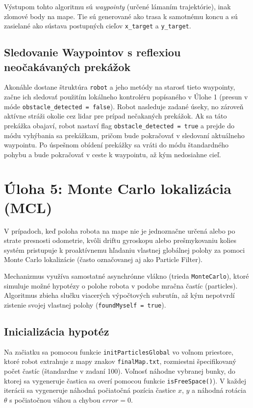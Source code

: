 Výstupom tohto algoritmu sú \textit{waypointy} (určené lámaním trajektórie), inak zlomové body na mape. Tie sú generované ako trasa k samotnému koncu a sú zasielané ako sústava postupných cieľov \texttt{x\_target} a \texttt{y\_target}. 

\subsection{Sledovanie Waypointov s reflexiou neočakávaných prekážok}
Akonáhle dostane štruktúra \texttt{robot} a jeho metódy na starosť tieto waypointy, začne ich sledovať použitím lokálneho kontroléru popísaného v Úlohe 1 (presun v móde \texttt{obstacle\_detected = false}). Robot nasleduje zadané úseky, no zároveň aktívne stráži okolie cez lidar pre prípad nečakaných prekážok. Ak sa táto prekážka obajaví, robot nastaví flag \texttt{obstacle\_detected = true} a prejde do módu vyhýbania sa prekážkam, pričom bude pokračovať v sledovaní aktuálneho waypointu. Po úspešnom obídení prekážky sa vráti do módu štandardného pohybu a bude pokračovať v ceste k waypointu, až kým nedosiahne cieľ.



\section{Úloha 5: Monte Carlo lokalizácia (MCL)}
V prípadoch, keď poloha robota na mape nie je jednoznačne určená alebo po strate presnosti odometrie, kvôli driftu gyroskopu alebo prešmykovaniu kolies systém pristupuje k proaktívnemu hľadaniu vlastnej globálnej polohy za pomoci Monte Carlo lokalizácie (často označovanej aj ako Particle Filter).

Mechanizmus využíva samostatné asynchrónne vlákno (trieda \texttt{MonteCarlo}), ktoré simuluje možné hypotézy o polohe robota v podobe mračna častíc (particles). Algoritmus zbieha slučku viacerých výpočtových subrutín, až kým nepotvrdí zistenie svojej vlastnej polohy (\texttt{foundMyself = true}).

\subsection{Inicializácia hypotéz}
Na začiatku sa pomocou funkcie \texttt{initParticlesGlobal} vo voľnom priestore, ktoré robot extrahuje z mapy znakov \texttt{finalMap.txt}, rozmiestni špecifikovaný počet častíc (štandardne v zadaní 100). Voľnosť náhodne vybranej bunky, do ktorej sa vygeneruje častica sa overí pomocou funkcie \texttt{isFreeSpace()}). V každej iterácii sa vygeneruje náhodná počiatočná pozícia častice $x$, $y$ a náhodná rotácia $\theta$ s počiatočnou váhou a chybou $error = 0$.

